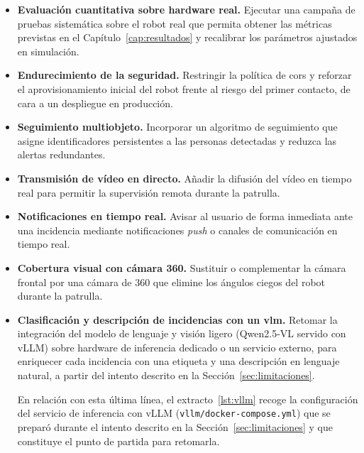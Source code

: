 \begin{itemize}
  \item \textbf{Evaluación cuantitativa sobre hardware real.} Ejecutar una campaña de
    pruebas sistemática sobre el robot real que permita obtener las métricas previstas en el
    Capítulo~\ref{cap:resultados} y recalibrar los parámetros ajustados en simulación.
  \item \textbf{Endurecimiento de la seguridad.} Restringir la política de \gls{cors} y
    reforzar el aprovisionamiento inicial del robot frente al riesgo del primer contacto, de
    cara a un despliegue en producción.
  \item \textbf{Seguimiento multiobjeto.} Incorporar un algoritmo de seguimiento que asigne
    identificadores persistentes a las personas detectadas y reduzca las alertas
    redundantes.
  \item \textbf{Transmisión de vídeo en directo.} Añadir la difusión del vídeo en tiempo
    real para permitir la supervisión remota durante la patrulla.
  \item \textbf{Notificaciones en tiempo real.} Avisar al usuario de forma inmediata ante
    una incidencia mediante notificaciones \textit{push} o canales de comunicación en tiempo
    real.
  \item \textbf{Cobertura visual con cámara 360\textdegree.} Sustituir o complementar la
    cámara frontal por una cámara de 360\textdegree{} que elimine los ángulos ciegos del
    robot durante la patrulla.
  \item \textbf{Clasificación y descripción de incidencias con un \gls{vlm}.} Retomar la
    integración del modelo de lenguaje y visión ligero (Qwen2.5-VL servido con vLLM) sobre
    hardware de inferencia dedicado o un servicio externo, para enriquecer cada incidencia
    con una etiqueta y una descripción en lenguaje natural, a partir del intento descrito en
    la Sección~\ref{sec:limitaciones}.

    En relación con esta última línea, el extracto~\ref{lst:vllm} recoge la configuración del
servicio de inferencia con vLLM (\texttt{vllm/docker-compose.yml}) que se preparó durante el
intento descrito en la Sección~\ref{sec:limitaciones} y que constituye el punto de partida
para retomarla.


\end{itemize}
